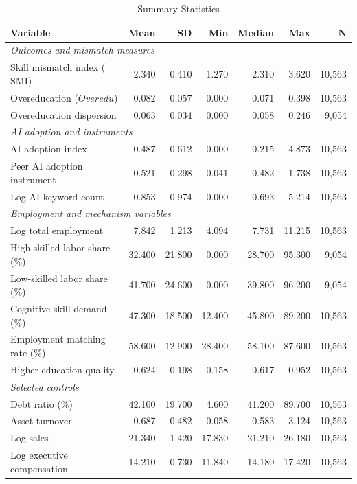 \documentclass[12pt,a4paper]{article}
\theoremstyle{predstyle}
\theoremstyle{plain}
\newcommand{\SMI}{\mathrm{SMI}}
\newcommand{\Overedu}{\mathit{Overedu}}
\begin{document}
\begin{table}[H]
\centering
\caption{Summary Statistics}
\label{tab:summary}
\begin{threeparttable}
\small
\begin{tabular}{lrrrrrr}
\toprule
Variable & Mean & SD & Min & Median & Max & N \\
\midrule
\multicolumn{7}{l}{\textit{Outcomes and mismatch measures}} \\
Skill mismatch index (\(\SMI\)) & 2.340 & 0.410 & 1.270 & 2.310 & 3.620 & 10,563 \\
Overeducation (\(\Overedu\)) & 0.082 & 0.057 & 0.000 & 0.071 & 0.398 & 10,563 \\
Overeducation dispersion & 0.063 & 0.034 & 0.000 & 0.058 & 0.246 & 9,054 \\
\multicolumn{7}{l}{\textit{AI adoption and instruments}} \\
AI adoption index & 0.487 & 0.612 & 0.000 & 0.215 & 4.873 & 10,563 \\
Peer AI adoption instrument & 0.521 & 0.298 & 0.041 & 0.482 & 1.738 & 10,563 \\
Log AI keyword count & 0.853 & 0.974 & 0.000 & 0.693 & 5.214 & 10,563 \\
\multicolumn{7}{l}{\textit{Employment and mechanism variables}} \\
Log total employment & 7.842 & 1.213 & 4.094 & 7.731 & 11.215 & 10,563 \\
High-skilled labor share (\%) & 32.400 & 21.800 & 0.000 & 28.700 & 95.300 & 9,054 \\
Low-skilled labor share (\%) & 41.700 & 24.600 & 0.000 & 39.800 & 96.200 & 9,054 \\
Cognitive skill demand (\%) & 47.300 & 18.500 & 12.400 & 45.800 & 89.200 & 10,563 \\
Employment matching rate (\%) & 58.600 & 12.900 & 28.400 & 58.100 & 87.600 & 10,563 \\
Higher education quality & 0.624 & 0.198 & 0.158 & 0.617 & 0.952 & 10,563 \\
\multicolumn{7}{l}{\textit{Selected controls}} \\
Debt ratio (\%) & 42.100 & 19.700 & 4.600 & 41.200 & 89.700 & 10,563 \\
Asset turnover & 0.687 & 0.482 & 0.058 & 0.583 & 3.124 & 10,563 \\
Log sales & 21.340 & 1.420 & 17.830 & 21.210 & 26.180 & 10,563 \\
Log executive compensation & 14.210 & 0.730 & 11.840 & 14.180 & 17.420 & 10,563 \\

\end{tabular}
\end{threeparttable}
\end{table}
\end{document}
